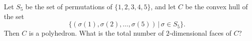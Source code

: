 Let $S_5$ be the set of permutations of $\{1,2,3,4,5\}$,  and let $C$ be the convex hull of the set$$\{(\sigma(1),\sigma(2),\ldots,\sigma(5))\,|\,\sigma\in S_5\}.$$Then $C$ is a polyhedron. What is the total number of $2$-dimensional faces of $C$?